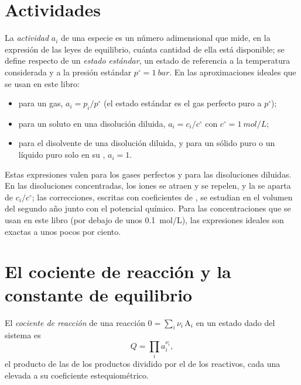 \section{Actividades}

\begin{definition}\label{def:b1:extent-q-and-k:activity}
La \emph{actividad} $a_i$ de una especie es un número
adimensional que mide, en la expresión de las leyes de equilibrio, cuánta
cantidad de ella está disponible; se define respecto de un \emph{estado
estándar}, un estado de referencia a la temperatura
considerada y a la presión estándar $p^\circ = \qty{1}{bar}$. En las
aproximaciones ideales que se usan en este libro:
\begin{itemize}
  \item para un gas, $a_i = p_i/p^\circ$ (el estado estándar es el gas
        perfecto puro a $p^\circ$);
  \item para un soluto en una disolución diluida, $a_i = c_i/c^\circ$ con
        $c^\circ = \qty{1}{mol/L}$;
  \item para el disolvente de una disolución diluida, y para un sólido
        puro o un líquido puro solo en su , $a_i = 1$.
\end{itemize}
\end{definition}

\begin{remark}\label{rem:b1:extent-q-and-k:ideal}
Estas expresiones valen para los gases perfectos y para las disoluciones
diluidas. En las disoluciones concentradas, los iones se atraen y se
repelen, y la  se aparta de $c_i/c^\circ$; las correcciones,
escritas con coeficientes de , se estudian en el volumen del
segundo año junto con el potencial químico. Para las concentraciones que
se usan en este libro (por debajo de unos \qty{0.1}{mol/L}), las
expresiones ideales son exactas a unos pocos por ciento.
\end{remark}

\section{El cociente de reacción y la constante de equilibrio}

\begin{definition}\label{def:b1:extent-q-and-k:quotient}
El \emph{cociente de reacción} de una reacción
$0 = \sum_i \nu_i\,\mathrm{A}_i$ en un estado dado del sistema es
\[
  Q = \prod_i a_i^{\nu_i} ,
\]
el producto de las  de los productos dividido por el de los
reactivos, cada una elevada a su coeficiente estequiométrico.
\end{definition}

